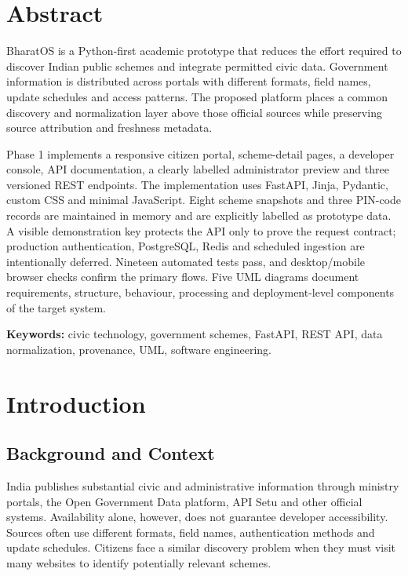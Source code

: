 \documentclass{tietreport}
\author{%
  \texttt{1024240135} Shivansh Singh \\
  \texttt{1024240155} Palveen Kaur \\
  \texttt{1024240106} Rajuss Sachdev \\
  \texttt{1024240006} Shivam Chauhan%
}
\begin{document}
\maketitle

\chapter*{Abstract}
BharatOS is a Python-first academic prototype that reduces the effort required to discover
Indian public schemes and integrate permitted civic data. Government information is
distributed across portals with different formats, field names, update schedules and access
patterns. The proposed platform places a common discovery and normalization layer above
those official sources while preserving source attribution and freshness metadata.

Phase 1 implements a responsive citizen portal, scheme-detail pages, a developer console,
API documentation, a clearly labelled administrator preview and three versioned REST
endpoints. The implementation uses FastAPI, Jinja, Pydantic, custom CSS and minimal
JavaScript. Eight scheme snapshots and three PIN-code records are maintained in memory and
are explicitly labelled as prototype data. A visible demonstration key protects the API only
to prove the request contract; production authentication, PostgreSQL, Redis and scheduled
ingestion are intentionally deferred. Nineteen automated tests pass, and desktop/mobile
browser checks confirm the primary flows. Five UML diagrams document requirements,
structure, behaviour, processing and deployment-level components of the target system.

\textbf{Keywords:} civic technology, government schemes, FastAPI, REST API, data
normalization, provenance, UML, software engineering.

\tableofcontents
\listoffigures
\listoftables

\chapter{Introduction}

\section{Background and Context}
India publishes substantial civic and administrative information through ministry portals,
the Open Government Data platform, API Setu and other official systems. Availability alone,
however, does not guarantee developer accessibility. Sources often use different formats,
field names, authentication methods and update schedules. Citizens face a similar discovery
problem when they must visit many websites to identify potentially relevant schemes.
\end{document}
